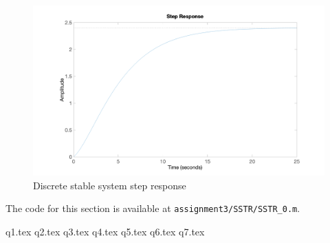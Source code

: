 \begin{figure}
	\centering
	\includegraphics[width=\textwidth]{images/sstr02.png}
	\caption{Discrete stable system step response}
	\label{fig:sstr02}
\end{figure}



\noindent The code for this section is available at \lstinline|assignment3/SSTR/SSTR_0.m|. 


{q1.tex}
{q2.tex}
{q3.tex}
{q4.tex}
{q5.tex}
{q6.tex}
{q7.tex}